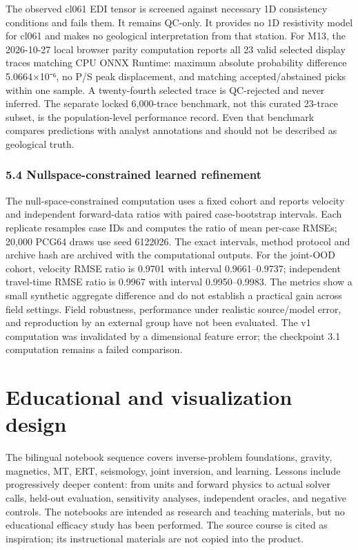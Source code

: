 The observed cl061 EDI tensor is screened against necessary 1D
consistency conditions and fails them. It remains QC-only. It provides
no 1D resistivity model for cl061 and makes no geological interpretation
from that station. For M13, the 2026-10-27 local browser parity
computation reports all 23 valid selected display traces matching CPU
ONNX Runtime: maximum absolute probability difference 5.0664×10⁻⁶, no
P/S peak displacement, and matching accepted/abstained picks within one
sample. A twenty-fourth selected trace is QC-rejected and never
inferred. The separate locked 6,000-trace benchmark, not this curated
23-trace subset, is the population-level performance record. Even that
benchmark compares predictions with analyst annotations and should not
be described as geological truth.

\subsubsection{5.4 Nullspace-constrained learned
refinement}\label{nullspace-constrained-learned-refinement}

The null-space-constrained computation uses a fixed cohort and reports
velocity and independent forward-data ratios with paired case-bootstrap
intervals. Each replicate resamples case IDs and computes the ratio of
mean per-case RMSEs; 20,000 PCG64 draws use seed 6122026. The exact
intervals, method protocol and archive hash are archived with the
computational outputs. For the joint-OOD cohort, velocity RMSE ratio is
0.9701 with interval 0.9661--0.9737; independent travel-time RMSE ratio
is 0.9967 with interval 0.9950--0.9983. The metrics show a small
synthetic aggregate difference and do not establish a practical gain
across field settings. Field robustness, performance under realistic
source/model error, and reproduction by an external group have not been
evaluated. The v1 computation was invalidated by a dimensional feature
error; the checkpoint 3.1 computation remains a failed comparison.

\section{Educational and visualization
design}\label{educational-and-visualization-design}

The bilingual notebook sequence covers inverse-problem foundations,
gravity, magnetics, MT, ERT, seismology, joint inversion, and learning.
Lessons include progressively deeper content: from units and forward
physics to actual solver calls, held-out evaluation, sensitivity
analyses, independent oracles, and negative controls. The notebooks are
intended as research and teaching materials, but no educational efficacy
study has been performed. The source course is cited as inspiration; its
instructional materials are not copied into the product.

